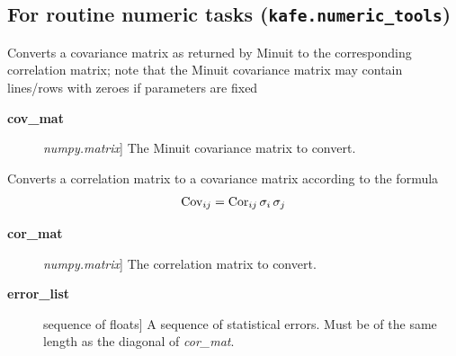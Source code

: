 \documentclass[a4paper,10pt,english]{sphinxmanual}
\begin{document}
\subsection{For routine numeric tasks (\texttt{kafe.numeric\_tools})}
\label{module_doc:module-kafe.numeric_tools}\label{module_doc:for-routine-numeric-tasks-kafe-numeric-tools}\label{module_doc:module-numeric_tools}

\begin{fulllineitems}
\label{module_doc:kafe.numeric_tools.MinuitCov_to_cor}
Converts a covariance matrix as returned by Minuit to the
corresponding correlation matrix; note that the Minuit
covariance matrix may contain lines/rows with zeroes if
parameters are fixed
\begin{description}
\item[{\textbf{cov\_mat}}] \leavevmode{[}\emph{numpy.matrix}{]}
The Minuit covariance matrix to convert.

\end{description}

\end{fulllineitems}


\begin{fulllineitems}
\label{module_doc:kafe.numeric_tools.cor_to_cov}
Converts a correlation matrix to a covariance matrix according to the
formula
\begin{gather}
\begin{split}\text{Cov}_{ij} = \text{Cor}_{ij}\, \sigma_i \, \sigma_j\end{split}\notag
\end{gather}\begin{description}
\item[{\textbf{cor\_mat}}] \leavevmode{[}\emph{numpy.matrix}{]}
The correlation matrix to convert.

\item[{\textbf{error\_list}}] \leavevmode{[}sequence of floats{]}
A sequence of statistical errors. Must be of the same length
as the diagonal of \emph{cor\_mat}.

\end{description}

\end{fulllineitems}
\end{document}
